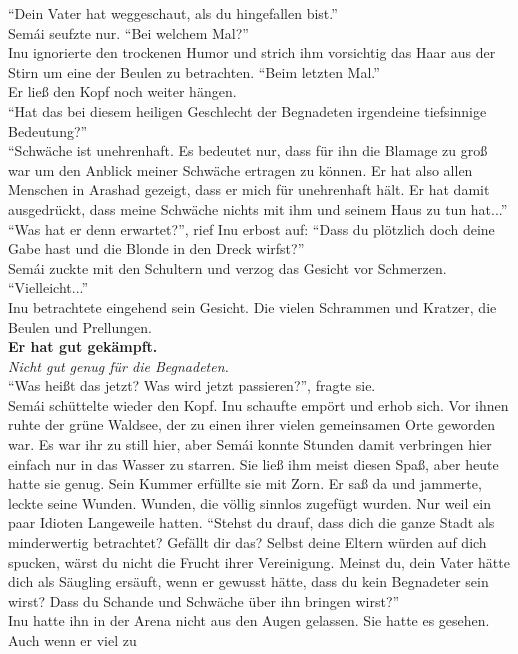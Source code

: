 ``Dein Vater hat weggeschaut, als du hingefallen bist.''\\
Semái seufzte nur. ``Bei welchem Mal?''\\
Inu ignorierte den trockenen Humor und strich ihm vorsichtig das Haar aus der Stirn um eine der 
Beulen zu betrachten. ``Beim letzten Mal.''\\
Er ließ den Kopf noch weiter hängen. \\
``Hat das bei diesem heiligen Geschlecht der Begnadeten irgendeine tiefsinnige Bedeutung?''\\
``Schwäche ist unehrenhaft. Es bedeutet nur, dass für ihn die Blamage zu groß war um den Anblick 
meiner Schwäche ertragen zu können. Er hat also allen Menschen in Arashad gezeigt, dass er mich für 
unehrenhaft hält. Er hat damit ausgedrückt, dass meine Schwäche nichts mit ihm und seinem Haus zu 
tun hat...''\\
``Was hat er denn erwartet?'', rief Inu erbost auf: ``Dass du plötzlich doch deine Gabe hast und 
die Blonde in den Dreck wirfst?''\\
Semái zuckte mit den Schultern und verzog das Gesicht vor Schmerzen. ``Vielleicht...''\\
Inu betrachtete eingehend sein Gesicht. Die vielen Schrammen und Kratzer, die Beulen und 
Prellungen.\\
\textbf{Er hat gut gekämpft.}\\
\textit{Nicht gut genug für die Begnadeten.}\\
``Was heißt das jetzt? Was wird jetzt passieren?'', fragte sie.\\
Semái schüttelte wieder den Kopf. Inu schaufte empört und erhob sich. Vor ihnen ruhte der grüne 
Waldsee, der zu einen ihrer vielen gemeinsamen Orte geworden war. Es war ihr zu still hier, aber 
Semái konnte Stunden damit verbringen hier einfach nur in das Wasser zu starren. Sie ließ ihm meist 
diesen Spaß, aber heute hatte sie genug. Sein Kummer erfüllte sie mit Zorn. Er saß da und jammerte, 
leckte seine Wunden. Wunden, die völlig sinnlos zugefügt wurden. Nur weil ein paar Idioten 
Langeweile hatten. ``Stehst du drauf, dass dich die ganze Stadt als minderwertig betrachtet? 
Gefällt dir das? Selbst deine Eltern würden auf dich spucken, wärst du nicht die Frucht ihrer 
Vereinigung. Meinst du, dein Vater hätte dich als Säugling ersäuft, wenn er gewusst hätte, dass du 
kein Begnadeter sein wirst? Dass du Schande und Schwäche über ihn bringen wirst?''\\
Inu hatte ihn in der Arena nicht aus den Augen gelassen. Sie hatte es gesehen. Auch wenn er viel zu 
